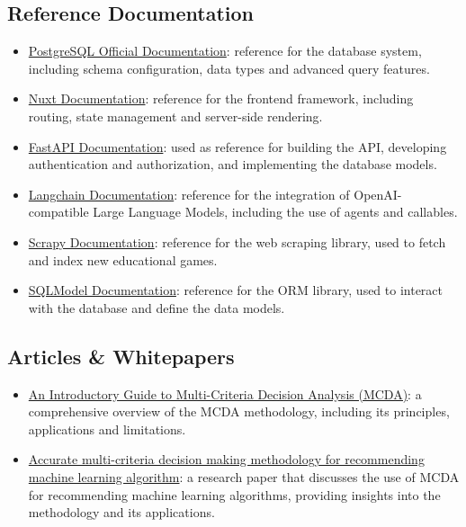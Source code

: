 \documentclass[11pt,italian,a4paper]{article}
\begin{document}
\subsection{Reference Documentation}
\begin{itemize}
    \item \href{https://www.postgresql.org/docs/current/}{PostgreSQL Official Documentation}: reference for the database system, including schema configuration, data types and advanced query features.
    \item \href{https://nuxt.com/docs/getting-started/introduction}{Nuxt Documentation}: reference for the frontend framework, including routing, state management and server-side rendering.
    \item \href{https://fastapi.tiangolo.com/tutorial/}{FastAPI Documentation}: used as reference for building the API, developing authentication and authorization, and implementing the database models.
    \item \href{https://langchain.com/docs/get_started/introduction.html}{Langchain Documentation}: reference for the integration of OpenAI-compatible Large Language Models, including the use of agents and callables.
    \item \href{https://scrapy.org/doc/en/latest/}{Scrapy Documentation}: reference for the web scraping library, used to fetch and index new educational games.
    \item \href{https://sqlmodel.tiangolo.com/}{SQLModel Documentation}: reference for the ORM library, used to interact with the database and define the data models.
\end{itemize}

\subsection{Articles \& Whitepapers}
\begin{itemize}
    \item \href{https://analysisfunction.civilservice.gov.uk/policy-store/an-introductory-guide-to-mcda/}{An Introductory Guide to Multi-Criteria Decision Analysis (MCDA)}: a comprehensive overview of the MCDA methodology, including its principles, applications and limitations.
    \item \href{https://www.sciencedirect.com/science/article/pii/S0957417416306698}{Accurate multi-criteria decision making methodology for recommending machine learning algorithm}: a research paper that discusses the use of MCDA for recommending machine learning algorithms, providing insights into the methodology and its applications.
\end{itemize}
\end{document}
